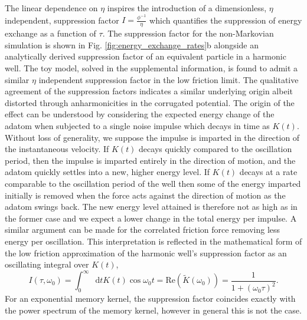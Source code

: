 \documentclass[7pt]{article}
\newcommand*{\diff}{\mathop{}\!\mathrm{d}}
\begin{document}
The linear dependence on $\eta$ inspires the introduction of a dimensionless, $\eta$ independent, suppression factor $I = \frac{\phi^{-1}}{\eta}$ which quantifies the suppression of energy exchange as a function of $\tau$. The suppression factor for the non-Markovian simulation is shown in Fig. \ref{fig:energy_exchange_rates}b alongside an analytically derived suppression factor of an equivalent particle in a harmonic well. The toy model, solved in the supplemental information, is found to admit a similar $\eta$ independent suppression factor in the low friction limit. The qualitative agreement of the suppression factors indicates a similar underlying origin albeit distorted through anharmonicities in the corrugated potential. The origin of the effect can be understood by considering the expected energy change of the adatom when subjected to a single noise impulse which decays in time as $K(t)$. Without loss of generality, we suppose the impulse is imparted in the direction of the instantaneous velocity. If $K(t)$ decays quickly compared to the oscillation period, then the impulse is imparted entirely in the direction of motion, and the adatom quickly settles into a new, higher energy level. If $K(t)$ decays at a rate comparable to the oscillation period of the well then some of the energy imparted initially is removed when the force acts against the direction of motion as the adatom swings back. The new energy level attained is therefore not as high as in the former case and we expect a lower change in the total energy per impulse. A similar argument can be made for the correlated friction force removing less energy per oscillation. This interpretation is reflected in the mathematical form of the low friction approximation of the harmonic well's suppression factor as an oscillating integral over $K(t)$,
\begin{equation}
	I(\tau, \omega_0) = \int_0^{\infty}\diff{t}K(t)\cos{\omega_0t} = \mathrm{Re}\left(\tilde{K}(\omega_0)\right) = \frac{1}{1+\left(\omega_0\tau\right)^2}.
	\label{eq:suppression_factor}
\end{equation}
For an exponential memory kernel, the suppression factor coincides exactly with the power spectrum of the memory kernel, however in general this is not the case. 
\end{document}
